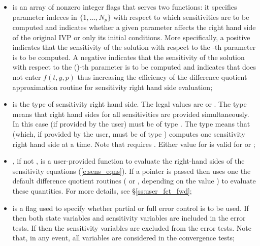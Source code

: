 \begin{itemize}
\item {} 
  is an array of  nonzero integer flags that serves two functions:
  it specifies parameter indeces in $\{1,\ldots,N_p\}$  
  with respect to which sensitivities are to be computed
  and indicates whether a given parameter affects the right hand side of the original
  IVP or only its initial conditions.
  More specifically, a positive  indicates that the sensitivity
  of the solution with respect to the -th parameter  is to be computed.
  A negative  indicates that the sensitivity of the solution with
  respect to the ()-th parameter  is to be computed and indicates
  that  does not enter $f(t,y,p)$ thus increasing the efficiency of the
  difference quotient approximation routine for sensitivity right hand side evaluation;
  
\item {} 
  is the type of sensitivity right hand side. The legal values are  
  or . The  type means that right hand sides for all   
  sensitivities are provided simultaneously. In this case 
   (if provided by the user) must be of type . 
  The  type means that  (which, if provided by   
  the user, must be of type ) computes one sensitivity right 
  hand side at a time. Note that  requires . 
  Either value for  is valid for  or 
  ;
  
\item {}, 
  if not , is a user-provided {\C} function
  to evaluate the right-hand sides of the sensitivity equations
  (\ref{e:sens_eqns}). If a  pointer is passed then {\cvodes}
  uses one the default difference quotient routines (
  or , depending on the value )
  to evaluate these quantities. For more details, see \S\ref{ss:user_fct_fwd};
  
\item {} 
  is a flag used to specify whether partial or full error control is to be used. 
  If  then both state variables and
  sensitivity variables are included in the error tests. 
  If  then the sensitivity variables are excluded from the 
  error tests. Note that, in any event, all variables are considered in the convergence 
  tests;
  

\end{itemize}
